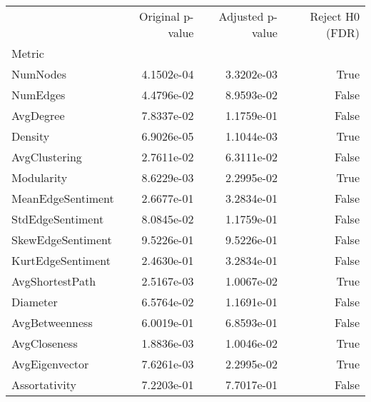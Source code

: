 \begin{tabular}{lrrr}
\toprule
 & Original p-value & Adjusted p-value & Reject H0 (FDR) \\
Metric &  &  &  \\
\midrule
NumNodes & 4.1502e-04 & 3.3202e-03 & True \\
NumEdges & 4.4796e-02 & 8.9593e-02 & False \\
AvgDegree & 7.8337e-02 & 1.1759e-01 & False \\
Density & 6.9026e-05 & 1.1044e-03 & True \\
AvgClustering & 2.7611e-02 & 6.3111e-02 & False \\
Modularity & 8.6229e-03 & 2.2995e-02 & True \\
MeanEdgeSentiment & 2.6677e-01 & 3.2834e-01 & False \\
StdEdgeSentiment & 8.0845e-02 & 1.1759e-01 & False \\
SkewEdgeSentiment & 9.5226e-01 & 9.5226e-01 & False \\
KurtEdgeSentiment & 2.4630e-01 & 3.2834e-01 & False \\
AvgShortestPath & 2.5167e-03 & 1.0067e-02 & True \\
Diameter & 6.5764e-02 & 1.1691e-01 & False \\
AvgBetweenness & 6.0019e-01 & 6.8593e-01 & False \\
AvgCloseness & 1.8836e-03 & 1.0046e-02 & True \\
AvgEigenvector & 7.6261e-03 & 2.2995e-02 & True \\
Assortativity & 7.2203e-01 & 7.7017e-01 & False \\
\bottomrule
\end{tabular}
